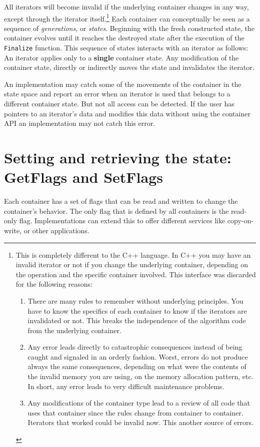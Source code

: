 \documentclass[12pt,a4paper,openany]{memoir} %
\begin{document}
All iterators will become invalid if the underlying container changes in any way, except through the iterator itself.\footnote{This is completely 
different to the C++ language. In C++ you may have an invalid iterator or not if you change the underlying container, depending on the 
operation and the specific container involved. This interface was discarded for the following reasons:
\begin{enumerate}
\item There are many rules to remember without underlying principles.
  You have to know the specifics of each container to know
  if the iterators are invalidated or not. This breaks the independence
   of the algorithm code from the underlying container.

\item Any error leads directly to catastrophic consequences instead
   of being caught and signaled in an orderly fashion. Worst, errors
   do not produce always the same consequences, depending on what
   were the contents of the invalid memory you are using, on the
   memory allocation pattern, etc. In short, any error leads to
   very difficult maintenance problems.

\item Any modifications of the container type lead to a review of
   all code that uses that container since the rules change from
   container to container. Iterators that worked could be invalid
   now. This another source of errors.
\end{enumerate}
}
Each container can conceptually be seen as a sequence of \textsl{generations}, or \textsl{states}. Beginning with the fresh constructed state, the container
evolves until it reaches the destroyed state after the execution of the \verb,Finalize, function. This sequence of states interacts with an
iterator as follows: An iterator applies only to a \textbf{single} container state. Any modification of the container state, directly or
indirectly moves the state and invalidates the iterator.

An implementation may catch some of the movements of the container in the state space and report an error when an iterator is used that belongs to 
a different container state. But not all access can be detected. If the user has pointers to an iterator's data and modifies this data without
using the container API an implementation may not catch this error.

\section{Setting and retrieving the state: GetFlags and SetFlags}
Each container has a set of flags that can be read and written to change the container's behavior. The only flag that is defined by all containers
is the read-only flag. Implementations can extend this to offer different services like copy-on-write, or other applications. 
\end{document}
